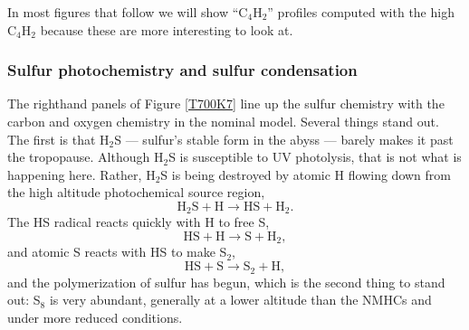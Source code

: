 \documentclass[preprint]{aastex6}
\begin{document}
In most figures that follow we will show ``C$_4$H$_2$'' profiles computed with the high C$_4$H$_2$ 
because these are more interesting to look at.

\subsubsection{Sulfur photochemistry and sulfur condensation}

The righthand panels of Figure \ref{T700K7} line up the sulfur chemistry with the carbon and oxygen chemistry
in the nominal model.
Several things stand out.  The first is that H$_2$S --- sulfur's stable form in the abyss --- barely makes it past the
tropopause.  Although H$_2$S is susceptible to UV photolysis, that is not what is happening here.
Rather, H$_2$S is being destroyed by atomic H flowing down from the high altitude photochemical source region,
\begin{equation}  \tag{R23}
 \mathrm{H}_2\mathrm{S} + \mathrm{H} \rightarrow  \mathrm{HS} + \mathrm{H}_2    .
\end{equation} 
The HS radical reacts quickly with H to free S, 
\begin{equation}  \tag{R9}
 \mathrm{HS} + \mathrm{H} \rightarrow  \mathrm{S} + \mathrm{H}_2    ,
\end{equation} 
and atomic S reacts with HS to make S$_2$,
\begin{equation}  \tag{R8}
 \mathrm{HS} + \mathrm{S} \rightarrow  \mathrm{S}_2 + \mathrm{H}   , 
\end{equation} 
and the polymerization of sulfur has begun, which is the 
second thing to stand out: S$_8$ is very abundant, generally
at a lower altitude than the NMHCs and under more reduced conditions.
\end{document}
